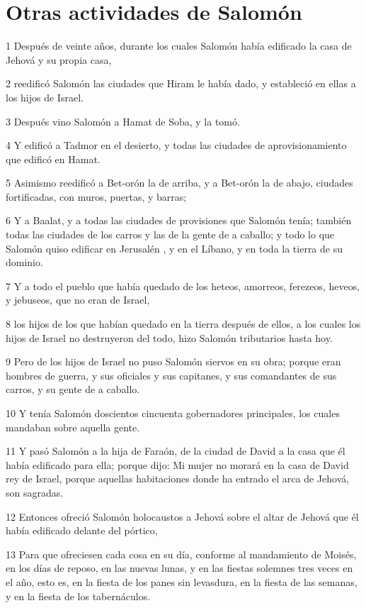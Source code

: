 \section*{Otras actividades de Salomón}

\par 1 Después de veinte años, durante los cuales Salomón había edificado la casa de Jehová y su propia casa,
\par 2 reedificó Salomón las ciudades que Hiram le había dado, y estableció en ellas a los hijos de Israel.
\par 3 Después vino Salomón a Hamat de Soba, y la tomó.
\par 4 Y edificó a Tadmor en el desierto, y todas las ciudades de aprovisionamiento que edificó en Hamat.
\par 5 Asimismo reedificó a Bet-orón la de arriba, y a Bet-orón  la de abajo, ciudades fortificadas, con muros, puertas, y barras;
\par 6 Y a Baalat, y a todas las ciudades de provisiones que Salomón tenía; también todas las ciudades de los carros y las de la gente de a caballo; y todo lo que Salomón quiso edificar en Jerusalén , y en el Líbano, y en toda la tierra de su dominio.
\par 7 Y a todo el pueblo que había quedado de los heteos, amorreos, ferezeos, heveos, y jebuseos, que no eran de Israel,
\par 8 los hijos de los que habían quedado en la tierra después de ellos, a los cuales los hijos de Israel no destruyeron del todo, hizo Salomón tributarios hasta hoy.
\par 9 Pero de los hijos de Israel no puso Salomón siervos en su obra; porque eran hombres de guerra, y sus oficiales y sus capitanes, y sus comandantes de sus carros, y su gente de a caballo.
\par 10 Y tenía Salomón doscientos cincuenta gobernadores principales, los cuales mandaban sobre aquella gente.
\par 11 Y pasó Salomón a la hija de Faraón, de la ciudad de David a la casa que él había edificado para ella; porque dijo: Mi mujer no morará en la casa de David rey de Israel, porque aquellas habitaciones donde ha entrado el arca de Jehová, son sagradas.
\par 12 Entonces ofreció Salomón holocaustos a Jehová sobre el altar de Jehová que él había edificado delante del pórtico,
\par 13 Para que ofreciesen cada cosa en su día, conforme al mandamiento de Moisés, en los días de reposo, en las nuevas lunas, y en las fiestas solemnes tres veces en el año, esto es, en la fiesta de los panes sin levasdura, en la fiesta de las semanas, y en la fiesta de los tabernáculos.
